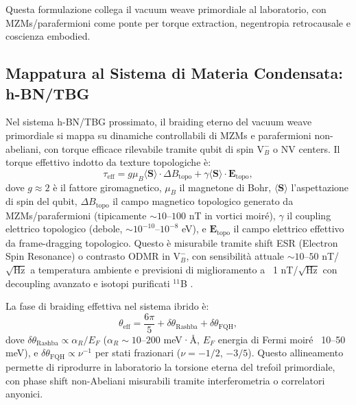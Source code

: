 \documentclass[11pt,a4paper]{article}
\let\oldcite\cite
\renewcommand{\cite}{\protect\oldcite}
\theoremstyle{plain}
\theoremstyle{definition}
\begin{document}
Questa formulazione collega il vacuum weave primordiale al laboratorio, con MZMs/parafermioni come ponte per torque extraction, negentropia retrocausale e coscienza embodied.

\vspace{0.7cm}



\subsection{Mappatura al Sistema di Materia Condensata: h-BN/TBG}

Nel sistema h-BN/TBG prossimato, il braiding eterno del vacuum weave primordiale si mappa su dinamiche controllabili di MZMs e parafermioni non-abeliani, con torque efficace rilevabile tramite qubit di spin $\mathrm{V}_B^-$ o NV centers. Il torque effettivo indotto da texture topologiche è:
\begin{equation}
\tau_{\mathrm{eff}} = g \mu_B \langle \mathbf{S} \rangle \cdot \Delta B_{\mathrm{topo}} + \gamma \langle \mathbf{S} \rangle \cdot \mathbf{E}_{\mathrm{topo}},
\end{equation}
dove $g \approx 2$ è il fattore giromagnetico, $\mu_B$ il magnetone di Bohr, $\langle \mathbf{S} \rangle$ l'aspettazione di spin del qubit, $\Delta B_{\mathrm{topo}}$ il campo magnetico topologico generato da MZMs/parafermioni (tipicamente $\sim 10$--$100$ nT in vortici moiré), $\gamma$ il coupling elettrico topologico (debole, $\sim 10^{-10}$--$10^{-8}$ eV), e $\mathbf{E}_{\text{topo}}$ il campo elettrico effettivo da frame-dragging topologico. Questo è misurabile tramite shift ESR (Electron Spin Resonance) o contrasto ODMR in $\mathrm{V}_B^-$, con sensibilità attuale $\sim 10$--$50$ nT/$\sqrt{\text{Hz}}$ a temperatura ambiente e previsioni di miglioramento a ~1 nT/$\sqrt{\text{Hz}}$ con decoupling avanzato e isotopi purificati $^{11}$B \cite{Gottscholl2021, Ramsay2023, Bourrellier2025}.

La fase di braiding effettiva nel sistema ibrido è:
\begin{equation}
\theta_{\mathrm{eff}} = \frac{6\pi}{5} + \delta \theta_{\mathrm{Rashba}} + \delta \theta_{\mathrm{FQH}},
\end{equation}
dove $\delta \theta_{\mathrm{Rashba}} \propto \alpha_R / E_F$ ($\alpha_R \sim 10$--$200$ meV·Å, $E_F$ energia di Fermi moiré ~10--50 meV), e $\delta \theta_{\mathrm{FQH}} \propto \nu^{-1}$ per stati frazionari ($\nu = -1/2$, $-3/5$). Questo allineamento permette di riprodurre in laboratorio la torsione eterna del trefoil primordiale, con phase shift non-Abeliani misurabili tramite interferometria o correlatori anyonici.
\end{document}

